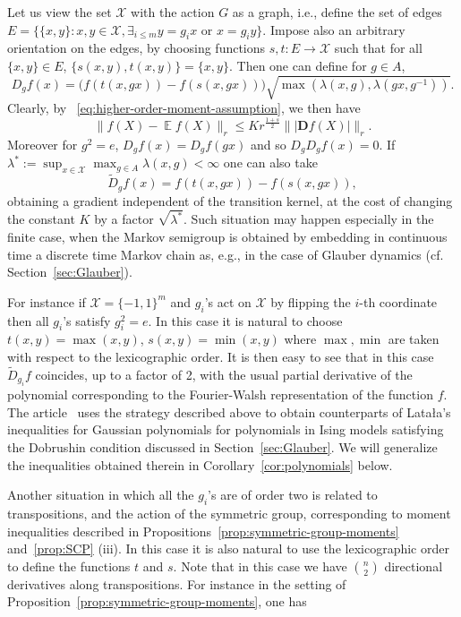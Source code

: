 \documentclass[a4paper]{amsart}
\theoremstyle{definition}
\theoremstyle{remark}
\numberwithin{equation}{section}
\DeclareMathOperator{\EE}{\mathbb{E}} %
\begin{document}
Let us view the set $\mathcal{X}$ with the action $G$ as a graph, i.e., define the set of edges $E = \{\{x,y\}\colon x,y \in \mathcal{X}, \exists_{i\le m} y = g_ix \textrm{ or } x = g_iy\}$. Impose also an arbitrary orientation on the edges, by choosing functions $s,t \colon E \to \mathcal{X}$ such that for all $\{x,y\} \in E$, $\{s(x,y),t(x,y)\} = \{x,y\}$. Then one can define for $g \in A$,
\begin{displaymath}
D_g f(x) = \bigl(f(t(x,gx))- f(s(x,gx))\bigr)\sqrt{\max(\lambda(x,g),\lambda(gx,g^{-1}))}.
\end{displaymath}
Clearly, by ~\eqref{eq:higher-order-moment-assumption}, we then have
\begin{displaymath}
  \|f(X) - \EE f(X)\|_r \le  Kr^{\frac{1+s}{2}} \Big\||\mathbf{D} f(X)|\Big\|_r.
\end{displaymath}
Moreover for $g^2 = e$, $D_gf(x) = D_g f(gx)$ and so $D_gD_g f(x) = 0$. If $\lambda^\ast := \sup_{x\in\mathcal{X}}\max_{g\in A} \lambda(x,g) < \infty$ one can also take
\begin{displaymath}
\widetilde{D}_g f(x) = f(t(x,gx))- f(s(x,gx)),
\end{displaymath}
obtaining a gradient independent of the transition kernel, at the cost of changing the constant $K$ by a factor $\sqrt{\lambda^\ast}$. Such situation may happen especially in the finite case, when the Markov semigroup is obtained by embedding in continuous time a discrete time Markov chain as, e.g., in the case of Glauber dynamics (cf. Section~\ref{sec:Glauber}).

For instance if $\mathcal{X} = \{-1,1\}^m$ and $g_i$'s act on $\mathcal{X}$ by flipping the $i$-th coordinate then all $g_i$'s satisfy $g_i^2 = e$. In this case it is natural to choose $t(x,y) = \max(x,y)$, $s(x,y) = \min(x,y)$ where $\max,\min$ are taken with respect to the lexicographic order. It is then easy to see that in this case $\widetilde{D}_{g_i} f$ coincides, up to a factor of 2, with the usual partial derivative of the polynomial corresponding to the Fourier-Walsh representation of the function $f$. The article~\cite{MR3949267} uses the strategy described above to obtain counterparts of Lata{\l}a's inequalities for Gaussian polynomials for polynomials in Ising models satisfying the Dobrushin condition discussed in Section~\ref{sec:Glauber}. We will generalize the inequalities obtained therein in Corollary~\ref{cor:polynomials} below.

Another situation in which all the $g_i$'s are of order two is related to transpositions, and the action of the symmetric group, corresponding to moment inequalities described in Propositions~\ref{prop:symmetric-group-moments} and~\ref{prop:SCP} (iii). In this case it is also natural to use the lexicographic order to define the functions $t$ and $s$. Note that in this case we have $\binom{n}{2}$ directional derivatives along transpositions. For instance in the setting of Proposition~\ref{prop:symmetric-group-moments}, one has
\end{document}
